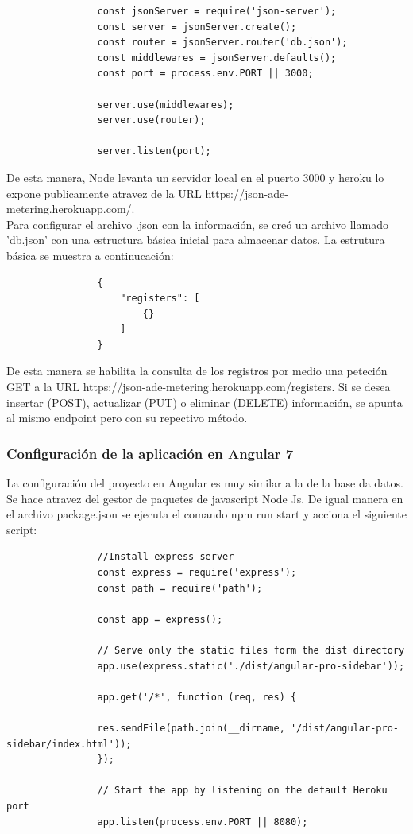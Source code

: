             \begin{lstlisting}
                const jsonServer = require('json-server');
                const server = jsonServer.create();
                const router = jsonServer.router('db.json');
                const middlewares = jsonServer.defaults();
                const port = process.env.PORT || 3000;
            
                server.use(middlewares);
                server.use(router);
            
                server.listen(port);
            \end{lstlisting}
            De esta manera, Node levanta un servidor local en el puerto 3000 y heroku lo expone publicamente atravez de la URL https://json-ade-metering.herokuapp.com/.\\
            Para configurar el archivo .json con la información, se creó un archivo llamado 'db.json' con una estructura básica inicial para almacenar datos. La estrutura básica se muestra a continucación:\\
            \begin{lstlisting}
                {
                    "registers": [
                        {}
                    ]
                }
            \end{lstlisting}
            De esta manera se habilita la consulta de los registros por medio una peteción GET a la URL https://json-ade-metering.herokuapp.com/registers. Si se desea insertar (POST), actualizar (PUT) o eliminar (DELETE) información, se apunta al mismo endpoint pero con su repectivo método.

        \subsubsection{Configuración de la aplicación en Angular 7}

            La configuración del proyecto en Angular es muy similar a la de la base da datos. Se hace atravez del gestor de paquetes de javascript Node Js. De igual manera en el archivo package.json se ejecuta el comando npm run start y acciona el siguiente script:

            \begin{lstlisting}
                //Install express server
                const express = require('express');
                const path = require('path');
            
                const app = express();
            
                // Serve only the static files form the dist directory
                app.use(express.static('./dist/angular-pro-sidebar'));
            
                app.get('/*', function (req, res) {
            
                res.sendFile(path.join(__dirname, '/dist/angular-pro-sidebar/index.html'));
                });
            
                // Start the app by listening on the default Heroku port
                app.listen(process.env.PORT || 8080);
            \end{lstlisting}

